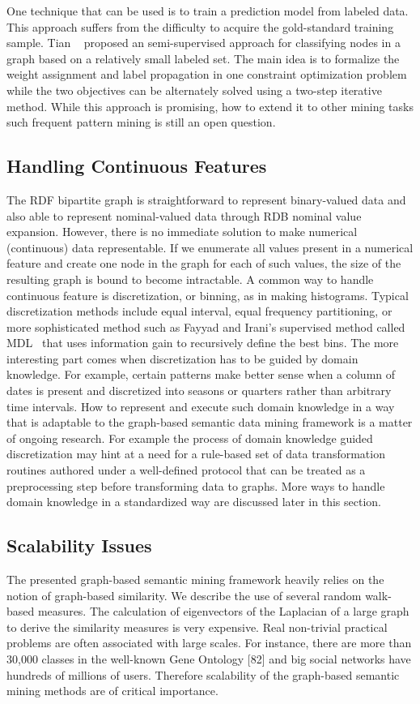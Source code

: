 One technique that can be used is to train a prediction model from labeled data. This approach suffers from the difficulty to acquire the gold-standard training sample. Tian \etal~\cite{Tian2009AHyper} proposed an semi-supervised approach for classifying nodes in a graph based on a relatively small labeled set. The main idea is to formalize the weight assignment and label propagation in one constraint optimization problem while the two objectives can be alternately solved using a two-step iterative method. While this approach is promising, how to extend it to other mining tasks such frequent pattern mining is still an open question.
\subsection{Handling Continuous Features}
The RDF bipartite graph is straightforward to represent binary-valued data and also able to represent nominal-valued data through RDB nominal value expansion. However, there is no immediate solution to make numerical (continuous) data representable. If we enumerate all values present in a numerical feature and create one node in the graph for each of such values, the size of the resulting graph is bound to become intractable. A common way to handle continuous feature is discretization, or binning, as in making histograms. Typical discretization methods include equal interval, equal frequency partitioning, or more sophisticated method such as Fayyad and Irani's supervised method called MDL~\cite{FayyadI93discretization} that uses information gain to recursively define the best bins. The more interesting part comes when discretization has to be guided by domain knowledge. For example, certain patterns make better sense when a column of dates is present and discretized into seasons or quarters rather than arbitrary time intervals. How to represent and execute such domain knowledge in a way that is adaptable to the graph-based semantic data mining framework is a matter of ongoing research. For example the process of domain knowledge guided discretization may hint at a need for a rule-based set of data transformation routines authored under a well-defined protocol that can be treated as a preprocessing step before transforming data to graphs. More ways to handle domain knowledge in a standardized way are discussed later in this section.

\subsection{Scalability Issues}
The presented graph-based semantic mining framework heavily relies on the notion of graph-based similarity. We describe the use of several random walk-based measures. The calculation of eigenvectors of the Laplacian of a large graph to derive the similarity measures is very expensive. Real non-trivial practical problems are often associated with large scales. For instance, there are
more than 30,000 classes in the well-known Gene Ontology [82] and big social networks have hundreds of millions of users. Therefore scalability of the graph-based semantic mining methods are of critical importance.

